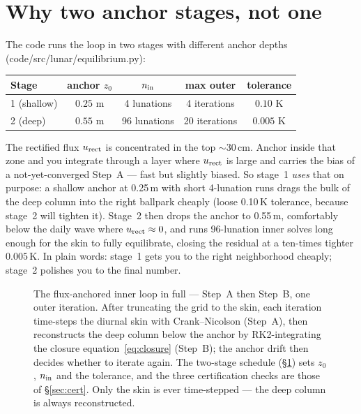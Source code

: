 \documentclass[11pt]{report}
\newcommand{\code}[1]{{\ttfamily\small #1}}
\begin{document}
\section{Why two anchor stages, not one}\label{sec:twostage}

The code runs the loop in two stages with different anchor depths
(\code{code/src/lunar/equilibrium.py}):
\begin{center}\small
\begin{tabular}{@{}lcccc@{}}
\toprule
Stage & anchor $z_0$ & $n_{\rm in}$ & max outer & tolerance \\
\midrule
1 (shallow) & $0.25$ m & 4 lunations  & 4 iterations  & $0.10$ K \\
2 (deep)    & $0.55$ m & 96 lunations & 20 iterations & $0.005$ K \\
\bottomrule
\end{tabular}
\end{center}

\noindent The rectified flux $u_{\rm rect}$ is concentrated in the top
$\sim$30\,cm. Anchor inside that zone and you integrate through a layer where
$u_{\rm rect}$ is large and carries the bias of a not-yet-converged Step~A ---
fast but slightly biased. So stage~1 \emph{uses} that on purpose: a shallow
anchor at 0.25\,m with short 4-lunation runs drags the bulk of the deep column
into the right ballpark cheaply (loose 0.10\,K tolerance, because stage~2 will
tighten it). Stage~2 then drops the anchor to 0.55\,m, comfortably below the
daily wave where $u_{\rm rect}\approx0$, and runs 96-lunation inner solves long
enough for the skin to fully equilibrate, closing the residual at a ten-times
tighter $0.005$\,K. In plain words: stage~1 gets you to the right neighborhood
cheaply; stage~2 polishes you to the final number.

\begin{figure}[p]\centering
\resizebox{!}{0.80\textheight}{}
\caption{The flux-anchored inner loop in full --- Step~A then Step~B, one outer
iteration. After truncating the grid to the skin, each iteration time-steps the
diurnal skin with Crank--Nicolson (Step~A), then reconstructs the deep column
below the anchor by RK2-integrating the closure equation~\eqref{eq:closure}
(Step~B); the anchor drift then decides whether to iterate again. The two-stage
schedule (\S\ref{sec:twostage}) sets $z_0$, $n_{\rm in}$ and the tolerance, and the
three certification checks are those of \S\ref{sec:cert}. Only the skin is ever
time-stepped --- the deep column is always reconstructed.}
\label{fig:stepsABflow}
\end{figure}
\end{document}
